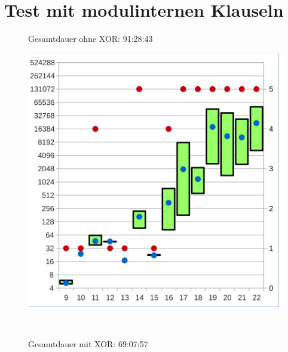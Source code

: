 \section{Test mit modulinternen Klauseln}


\begin{figure}[!h]
  \centering
  \begin{minipage}[c]{0.45\textwidth}
  \begin{flushleft}Gesamtdauer ohne XOR: 91:28:43\end{flushleft}
  \includegraphics[scale=0.55]{images/data_modul_knf}
  \end{minipage}
  \begin{minipage}[c]{0.09\textwidth}
  ~~
  \end{minipage}
  \begin{minipage}[c]{0.45\textwidth}
  \begin{flushleft}Gesamtdauer mit XOR: 69:07:57\end{flushleft}

\end{minipage}
\end{figure}
